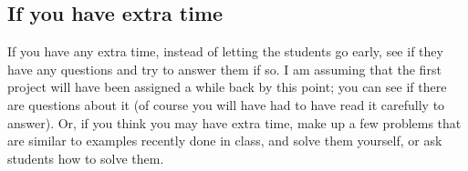 \documentclass[12pt]{article}
\begin{document}
      \vspace{-2.5mm}
  
    \subsection{If you have extra time}
  
      If you have any extra time, instead of letting the students go early,
    see if they have any questions and try to answer them if so.  I am
    assuming that the first project will have been assigned a while back by
    this point; you can see if there are questions about it (of course you
    will have had to have read it carefully to answer).  Or, if you think
    you may have extra time, make up a few problems that are similar to
    examples recently done in class, and solve them yourself, or ask
    students how to solve them.
\end{document}
